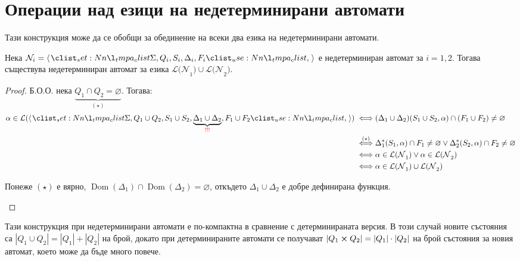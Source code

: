 \section{Операции над езици на недетерминирани автомати}

Тази конструкция може да се обобщи за обединение на всеки два езика на недетерминирани автомати.

\begin{claim}
    Нека $\mathcal{N}_i = \opair{\Sigma, Q_i, S_i, \Delta_i, F_i}$  е недетерминиран автомат за $i = 1, 2$.
    Тогава съществува недетерминиран автомат за езика $\mathcal{L(N}_1) \cup \mathcal{L(N}_2)$.
\end{claim}

\begin{proof}
    Б.О.О. нека $\underbrace{Q_1 \cap Q_2 = \varnothing}_{(\star)}$. Тогава:
    \begin{align*}
        \alpha \in \mathcal{L}(\opair{\Sigma, Q_1 \cup Q_2, S_1 \cup S_2, \underbrace{\Delta_1 \cup \Delta_2}_{\textcolor{red}{!!!}}, F_1 \cup F_2}) \iff & (\Delta_1 \cup \Delta_2)(S_1 \cup S_2, \alpha) \cap (F_1 \cup F_2) \neq \varnothing                      \\
        \stackrel{(\star)}{\iff}                                                                                                                          & \Delta_1^*(S_1, \alpha) \cap F_1 \neq \varnothing \lor \Delta_2^*(S_2, \alpha) \cap F_2 \neq \varnothing \\
        \iff                                                                                                                                              & \alpha \in \mathcal{L(N}_1) \lor \alpha \in \mathcal{L(N}_2)                                             \\
        \iff                                                                                                                                              & \alpha \in \mathcal{L(N}_1) \cup \mathcal{L(N}_2)
    \end{align*}
    \begin{remark}[\textcolor{red}{!!!}]
        Понеже $(\star)$ е вярно, $\operatorname{Dom}(\Delta_1) \cap \operatorname{Dom}(\Delta_2) = \varnothing$, откъдето $\Delta_1 \cup \Delta_2$ е добре дефинирана функция.
    \end{remark}
\end{proof}

Тази конструкция при недетерминирани автомати е по-компактна в сравнение с детерминираната версия.
В този случай новите състояния са $|Q_1 \cup Q_2| = |Q_1| + |Q_2|$ на брой,
докато при детерминираните автомати се получават $|Q_1 \crossproduct Q_2| = |Q_1| \cdot |Q_2|$ на брой състояния за новия автомат, което може да бъде много повече.

